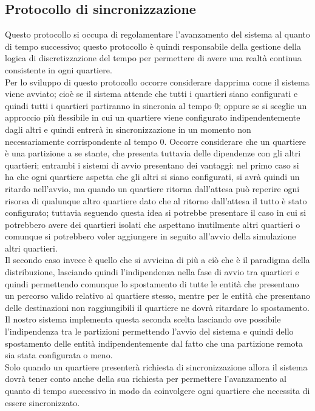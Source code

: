 \subsection{Protocollo di sincronizzazione}
Questo protocollo si occupa di regolamentare l'avanzamento del sistema al quanto di tempo successivo; questo protocollo è quindi responsabile della gestione della logica di discretizzazione del tempo per permettere di avere una realtà continua consistente in ogni quartiere.\\
Per lo sviluppo di questo protocollo occorre considerare dapprima come il sistema viene avviato; cioè se il sistema attende che tutti i quartieri siano configurati e quindi tutti i quartieri partiranno in sincronia al tempo 0; oppure se si sceglie un approccio più flessibile in cui un quartiere viene configurato indipendentemente dagli altri e quindi entrerà in sincronizzazione in un momento non necessariamente corrispondente al tempo 0. Occorre considerare che un quartiere è una partizione a se stante, che presenta tuttavia delle dipendenze con gli altri quartieri; entrambi i sistemi di avvio presentano dei vantaggi: nel primo caso si ha che ogni quartiere aspetta che gli altri si siano configurati, si avrà quindi un ritardo nell'avvio, ma quando un quartiere ritorna dall'attesa può reperire ogni risorsa di qualunque altro quartiere dato che al ritorno dall'attesa il tutto è stato configurato; tuttavia seguendo questa idea si potrebbe presentare il caso in cui si potrebbero avere dei quartieri isolati che aspettano inutilmente altri quartieri o comunque si potrebbero voler aggiungere in seguito all'avvio della simulazione altri quartieri.\\
Il secondo caso invece è quello che si avvicina di più a ciò che è il paradigma della distribuzione, lasciando quindi l'indipendenza nella fase di avvio tra quartieri e quindi permettendo comunque lo spostamento di tutte le entità che presentano un percorso valido relativo al quartiere stesso, mentre per le entità che presentano delle destinazioni non raggiungibili il quartiere ne dovrà ritardare lo spostamento. Il nostro sistema implementa questa seconda scelta lasciando ove possibile l'indipendenza tra le partizioni permettendo l'avvio del sistema e quindi dello spostamento delle entità indipendentemente dal fatto che una partizione remota sia stata configurata o meno.\\
Solo quando un quartiere presenterà richiesta di sincronizzazione allora il sistema dovrà tener conto anche della sua richiesta per permettere l'avanzamento al quanto di tempo successivo in modo da coinvolgere ogni quartiere che necessita di essere sincronizzato.\\

